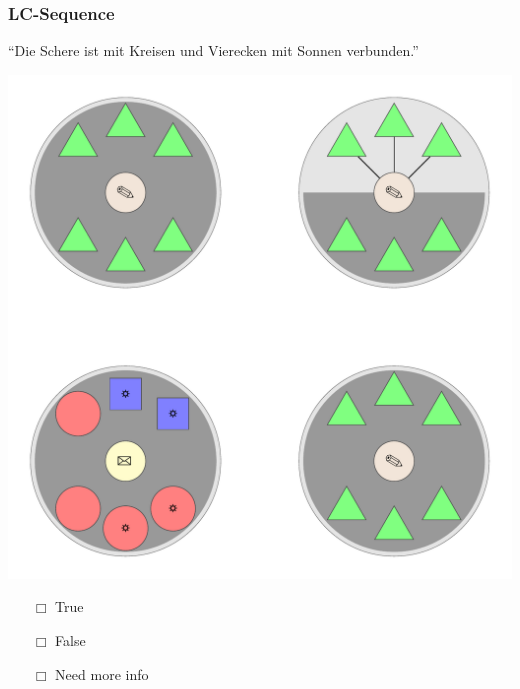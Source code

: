 \documentclass[fleqn,10pt,serif,xcolor=dvipsnames]{beamer}
\newcommand{\LC}{LC}
\newcommand{\mymark}[1]{{\color{blue}{#1}}}
\begin{document}
\begin{frame}
  \frametitle{\LC-Sequence}
  \begin{center}
    ``Die Schere ist mit Kreisen und Vierecken mit Sonnen verbunden.''

    \vspace{0.1cm}

    \includegraphics[width=0.5 \textwidth]{../../pictures/lc_01_2.pdf}

    \vspace{0.1cm}

    \begin{multicols}{3}
      \begin{itemize} 
      \item[$\Box$] True\\
        \onslide<2>{$\leadsto$  \mymark{false}}
      \item[$\Box$] False\\
        \onslide<2>{$\leadsto$ \mymark{false}}
      \item[$\Box$] Need more info 
      \end{itemize}
    \end{multicols}

  \end{center}
\end{frame}
\end{document}
